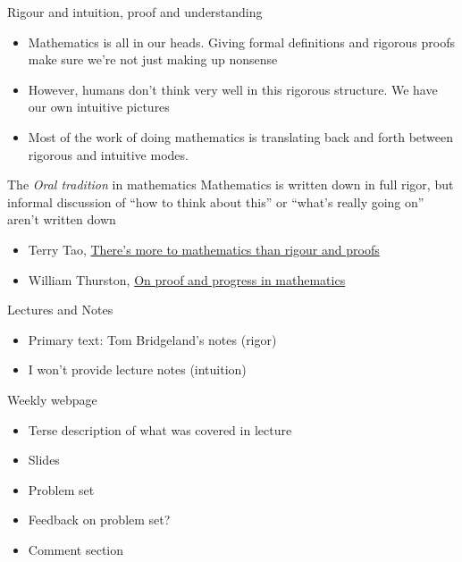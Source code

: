 \documentclass{beamer}
\begin{document}
\begin{frame}{Rigour and intuition, proof and understanding}

\begin{itemize}
\item Mathematics is all in our heads.  Giving formal definitions and rigorous proofs make sure we're not just making up nonsense
\item However, humans don't think very well in this rigorous structure.  We have our own intuitive pictures
\item Most of the work of doing mathematics is translating back and forth between rigorous and intuitive modes.
\end{itemize}


\begin{block}{The \emph{Oral tradition} in mathematics}
Mathematics is written down in full rigor, but informal discussion of ``how to think about this'' or  ``what's really going on'' aren't written down
\end{block}


\begin{itemize}
\item Terry Tao, \href{https://terrytao.wordpress.com/career-advice/there’s-more-to-mathematics-than-rigour-and-proofs/}{There's more to mathematics than rigour and proofs}
\item William Thurston, \href{https://arxiv.org/abs/math/9404236}{On proof and progress in mathematics}
\end{itemize}


\end{frame}


\begin{frame}{Lectures and Notes}

\begin{itemize}
\item  Primary text: Tom Bridgeland's notes (rigor)
\item I won't provide lecture notes (intuition)
\end{itemize}

\begin{block}{Weekly webpage}
\begin{itemize}
\item Terse description of what was covered in lecture
\item Slides
\item Problem set
\item Feedback on problem set?
\item Comment section
\end{itemize}
\end{block}
\end{frame}
\end{document}
